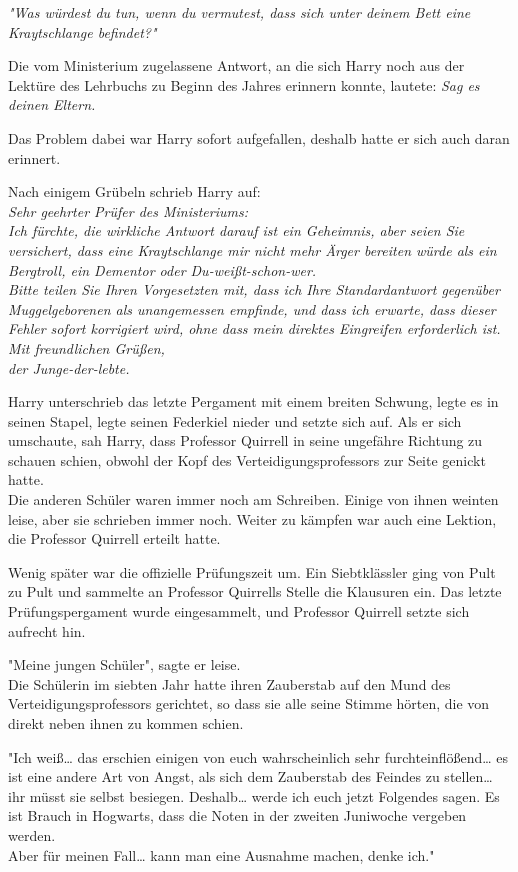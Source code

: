 {\emph{"Was würdest du tun, wenn du vermutest, dass sich unter deinem Bett eine Kraytschlange befindet?"}

Die vom Ministerium zugelassene Antwort, an die sich Harry noch aus der Lektüre des Lehrbuchs zu Beginn des Jahres erinnern konnte, lautete: \emph{Sag es deinen Eltern.}

Das Problem dabei war Harry sofort aufgefallen, deshalb hatte er sich auch daran erinnert.

Nach einigem Grübeln schrieb Harry auf:\\ \emph{Sehr geehrter Prüfer des Ministeriums:}\\ \emph{Ich fürchte, die wirkliche Antwort darauf ist ein Geheimnis, aber seien Sie versichert, dass eine Kraytschlange mir nicht mehr Ärger bereiten würde als ein Bergtroll, ein Dementor oder Du-weißt-schon-wer.}\\ \emph{\hfill\break Bitte teilen Sie Ihren Vorgesetzten mit, dass ich Ihre Standardantwort gegenüber} \emph{Muggelgeborenen als unangemessen empfinde, und dass ich erwarte, dass dieser Fehler sofort korrigiert wird, ohne dass mein direktes Eingreifen erforderlich ist.}\\ \emph{\hfill\break Mit freundlichen Grüßen,}\\ \emph{der Junge-der-lebte.}

Harry unterschrieb das letzte Pergament mit einem breiten Schwung, legte es in seinen Stapel, legte seinen Federkiel nieder und setzte sich auf. Als er sich umschaute, sah Harry, dass Professor Quirrell in seine ungefähre Richtung zu schauen schien, obwohl der Kopf des Verteidigungsprofessors zur Seite genickt hatte.\\ Die anderen Schüler waren immer noch am Schreiben. Einige von ihnen weinten leise, aber sie schrieben immer noch. Weiter zu kämpfen war auch eine Lektion, die Professor Quirrell erteilt hatte.

Wenig später war die offizielle Prüfungszeit um. Ein Siebtklässler ging von Pult zu Pult und sammelte an Professor Quirrells Stelle die Klausuren ein. Das letzte Prüfungspergament wurde eingesammelt, und Professor Quirrell setzte sich aufrecht hin.

"Meine jungen Schüler", sagte er leise.\\ Die Schülerin im siebten Jahr hatte ihren Zauberstab auf den Mund des Verteidigungsprofessors gerichtet, so dass sie alle seine Stimme hörten, die von direkt neben ihnen zu kommen schien.

"Ich weiß… das erschien einigen von euch wahrscheinlich sehr furchteinflößend… es ist eine andere Art von Angst, als sich dem Zauberstab des Feindes zu stellen… ihr müsst sie selbst besiegen. Deshalb… werde ich euch jetzt Folgendes sagen. Es ist Brauch in Hogwarts, dass die Noten in der zweiten Juniwoche vergeben werden.\\ Aber für meinen Fall… kann man eine Ausnahme machen, denke ich."

}
